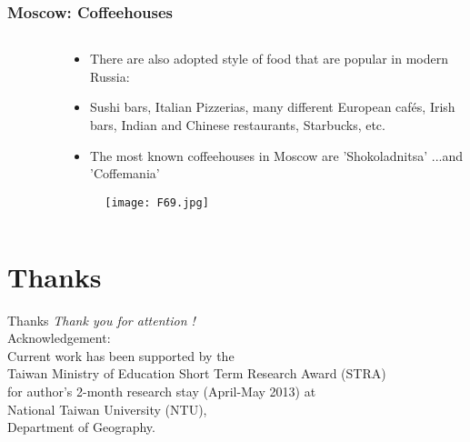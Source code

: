 \documentclass[pdflatex,compress,8pt,
	xcolor={dvipsnames,dvipsnames,svgnames,x11names,table},
	hyperref={colorlinks = true,breaklinks = true, urlcolor = NavyBlue, breaklinks = true}]{beamer}
\begin{document}
\begin{frame}\frametitle{Moscow: Coffeehouses}
\begin{minipage}[0.4\textheight]{\textwidth}
\begin{columns}[T]
\begin{column}{0.5\textwidth}
\begin{figure}[H]
	\centering
			\vspace{1mm}
\end{figure}
\end{column}
\begin{column}{0.5\textwidth}
\vspace{2em} 
\begin{itemize}
	\item There are also adopted style of food that are popular in modern Russia: 
	\item Sushi bars, Italian Pizzerias, many different European caf\'{e}s, Irish bars, Indian and Chinese restaurants, Starbucks, etc.
	\item The most known coffeehouses in Moscow are 'Shokoladnitsa' ...and 'Coffemania'
\end{itemize}
\begin{figure}[H]
	\centering
		\texttt{[image: F69.jpg]}
\end{figure}
\end{column}
\end{columns}
\end{minipage}
\end{frame}
        
\section{Thanks}
\begin{frame}{Thanks}
  	\centering \LARGE 
	\emph{Thank you for attention !}\\
	\vspace{5em}
\normalsize
Acknowledgement: \\
Current work has been supported by the \\
Taiwan Ministry of Education Short Term Research Award (STRA) \\
for author's 2-month research stay (April-May 2013) at\\
National Taiwan University (NTU), \\
Department of Geography.
\end{frame}
\end{document}
